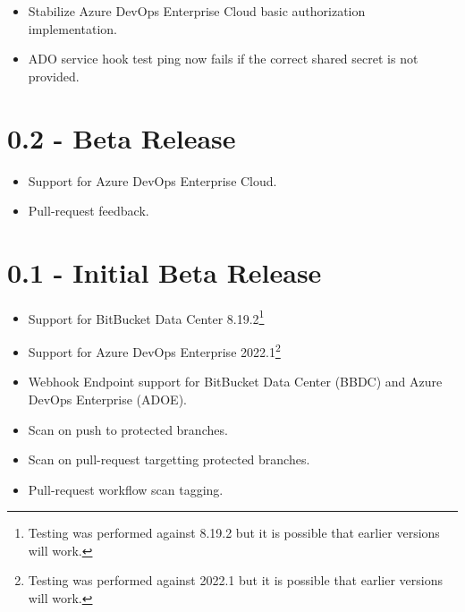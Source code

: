 \begin{itemize}
    \item Stabilize Azure DevOps Enterprise Cloud basic authorization implementation.
    \item ADO service hook test ping now fails if the correct shared secret is not provided.
\end{itemize}


\section{0.2 - Beta Release}
   

\begin{itemize}
    \item Support for Azure DevOps Enterprise Cloud.
    \item Pull-request feedback.
\end{itemize}

\section{0.1 - Initial Beta Release}
   

\begin{itemize}
    \item Support for BitBucket Data Center 8.19.2\footnote{Testing was performed against 8.19.2 but it is possible that earlier versions will work.}
    \item Support for Azure DevOps Enterprise 2022.1\footnote{Testing was performed against 2022.1 but it is possible that earlier versions will work.}
    \item Webhook Endpoint support for BitBucket Data Center (BBDC) and Azure DevOps Enterprise (ADOE).
    \item Scan on push to protected branches.
    \item Scan on pull-request targetting protected branches.
    \item Pull-request workflow scan tagging.
\end{itemize}